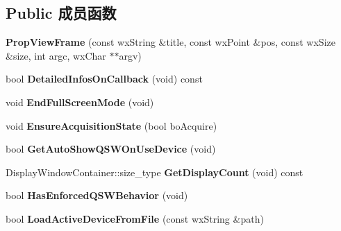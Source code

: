 \subsection*{Public 成员函数}
\begin{DoxyCompactItemize}
\item 
\hypertarget{class_prop_view_frame_a3c1d50f9516d1b5eef5ee077d538409b}{{\bfseries Prop\+View\+Frame} (const wx\+String \&title, const wx\+Point \&pos, const wx\+Size \&size, int argc, wx\+Char $\ast$$\ast$argv)}\label{class_prop_view_frame_a3c1d50f9516d1b5eef5ee077d538409b}

\item 
\hypertarget{class_prop_view_frame_acd8bef12727ac8ea36af6244af3cd772}{bool {\bfseries Detailed\+Infos\+On\+Callback} (void) const }\label{class_prop_view_frame_acd8bef12727ac8ea36af6244af3cd772}

\item 
\hypertarget{class_prop_view_frame_a5f5e28f6be2e6b21b6f26e713530f556}{void {\bfseries End\+Full\+Screen\+Mode} (void)}\label{class_prop_view_frame_a5f5e28f6be2e6b21b6f26e713530f556}

\item 
\hypertarget{class_prop_view_frame_ac51539f24921cb00cda5a90a3bcbf260}{void {\bfseries Ensure\+Acquisition\+State} (bool bo\+Acquire)}\label{class_prop_view_frame_ac51539f24921cb00cda5a90a3bcbf260}

\item 
\hypertarget{class_prop_view_frame_a73014ccb87ed749149f82a5e48914e8f}{bool {\bfseries Get\+Auto\+Show\+Q\+S\+W\+On\+Use\+Device} (void)}\label{class_prop_view_frame_a73014ccb87ed749149f82a5e48914e8f}

\item 
\hypertarget{class_prop_view_frame_a74b293c2caaba83fb3d9de6a73802db6}{Display\+Window\+Container\+::size\+\_\+type {\bfseries Get\+Display\+Count} (void) const }\label{class_prop_view_frame_a74b293c2caaba83fb3d9de6a73802db6}

\item 
\hypertarget{class_prop_view_frame_aec16b512af341142c3d895da9bc24c89}{bool {\bfseries Has\+Enforced\+Q\+S\+W\+Behavior} (void)}\label{class_prop_view_frame_aec16b512af341142c3d895da9bc24c89}

\item 
\hypertarget{class_prop_view_frame_a65cf4a5464672dfd87707b052bc13e65}{bool {\bfseries Load\+Active\+Device\+From\+File} (const wx\+String \&path)}\label{class_prop_view_frame_a65cf4a5464672dfd87707b052bc13e65}


\end{DoxyCompactItemize}
